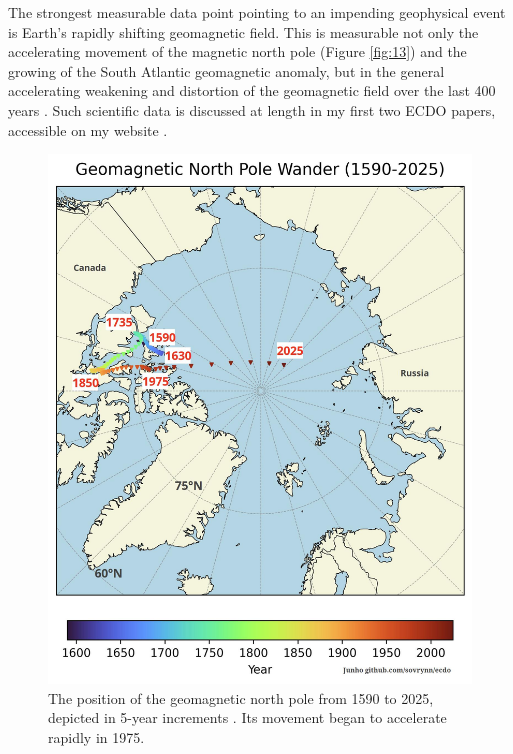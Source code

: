 \documentclass[10pt,twocolumn,letterpaper]{article}
\begin{document}
The strongest measurable data point pointing to an impending geophysical event is Earth's rapidly shifting geomagnetic field. This is measurable not only the accelerating movement of the magnetic north pole (Figure \ref{fig:13}) and the growing of the South Atlantic geomagnetic anomaly, but in the general accelerating weakening and distortion of the geomagnetic field over the last 400 years \cite{3}. Such scientific data is discussed at length in my first two ECDO papers, accessible on my website \cite{3}.

\begin{figure}[t]
\begin{center}
   \includegraphics[width=1\linewidth]{npw.jpg}
\end{center}
   \caption{The position of the geomagnetic north pole from 1590 to 2025, depicted in 5-year increments \cite{41}. Its movement began to accelerate rapidly in 1975.}
\label{fig:13}
\label{fig:onecol}
\end{figure}
\end{document}
